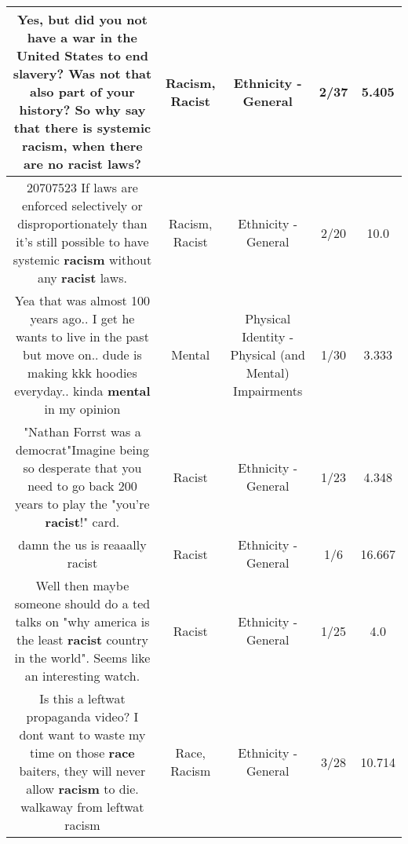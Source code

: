 \documentclass[11pt]{article}
\newlength\mylength
\begin{document}
\begin{center}
\begin{longtable}{|C{.65\mylength}|C{.30\mylength}|C{.12\mylength}|C{.12\mylength}|C{.12\mylength}|}
  \small Yes, but did you not have a war in the United States to end slavery? Was not that also part of your history? So why say that there is systemic \textbf{racism}, when there are no \textbf{racist} laws?\normalsize   & Racism, Racist & Ethnicity - General & 2/37 & 5.405 \\  \hline
  \small \@20707523 If laws are enforced selectively or disproportionately than it's still possible to have systemic \textbf{racism} without any \textbf{racist} laws.\normalsize   & Racism, Racist & Ethnicity - General & 2/20 & 10.0 \\  \hline
  \small Yea that was almost 100 years ago.. I get he wants to live in the past but move on.. dude is making kkk hoodies everyday.. kinda \textbf{mental} in my opinion\normalsize   & Mental & Physical Identity - Physical (and Mental) Impairments & 1/30 & 3.333 \\  \hline
  \small "Nathan Forrst was a democrat"Imagine being so desperate that you need to go back 200 years to play the "you're \textbf{racist}!" card.\normalsize   & Racist & Ethnicity - General & 1/23 & 4.348 \\  \hline
  \small damn the us is reaaally racist\normalsize   & Racist & Ethnicity - General & 1/6 & 16.667 \\  \hline
  \small Well then maybe someone should do a ted talks on "why america is the least \textbf{racist} country in the world". Seems like an interesting watch.\normalsize   & Racist & Ethnicity - General & 1/25 & 4.0 \\  \hline
  \small Is this a leftwat propaganda video?  I dont want to waste my time on those \textbf{race} baiters, they will never allow \textbf{racism} to die.  walkaway from leftwat racism\normalsize   & Race, Racism & Ethnicity - General & 3/28 & 10.714 \\  \hline

\end{longtable}
\end{center}
\end{document}
